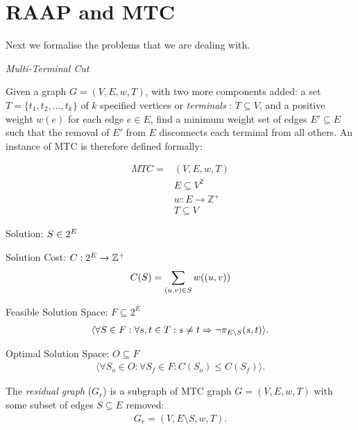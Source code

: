 \section{RAAP and MTC}

Next we formalise the problems that we are dealing with.

\begin{definition}
{\em Multi-Terminal Cut}

Given a graph $G=(V,E,w,T)$, with two more components added: a set $T=\{t_1, t_2, ..., t_k\}$ of $k$ specified vertices or {\em terminals} : $T \subseteq V$, and a positive weight $w(e)$ for each edge $e \in E$, find a minimum weight set of edges $E' \subseteq E$ such that the removal of $E'$ from $E$ disconnects each terminal from all others.
An instance of MTC is therefore defined formally:

\begin{align}
	\nonumber MTC = & (V,E,w,T)\\
	\nonumber & E \subseteq V^2\\
	\nonumber & w : E \rightarrow \mathbb{Z}^+\\
	\nonumber & T \subseteq V
\end{align}

Solution: $S \in 2^E$

Solution Cost: $C : 2^E \rightarrow \mathbb{Z}^+$
\begin{align}
	\nonumber C(S) = \displaystyle\sum\limits_{(u,v) \in S} w((u,v))
\end{align}

Feasible Solution Space: $F \subseteq 2^E$
\begin{align}
	\nonumber \langle \forall S \in F : \forall s, t \in T: s \neq t \Rightarrow \neg\pi_{E \setminus S}(s, t) \rangle .
\end{align}

Optimal Solution Space: $O \subseteq F$
\begin{align}
	\nonumber \langle \forall S_o \in O : \forall S_f \in F : C(S_o) \leq C(S_f) \rangle .
\end{align}

\end{definition}

\begin{definition}
The {\em residual graph} ($G_r$) is a subgraph of MTC graph $G=(V,E,w,T)$ with some subset of edges $S \subseteq E$ removed:
\begin{align}
	\nonumber G_r = (V, E \setminus S, w, T).
\end{align}
\end{definition}

